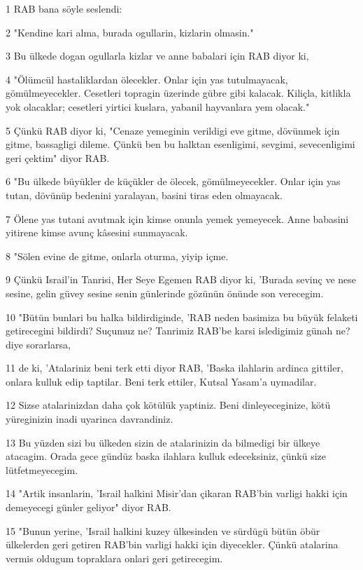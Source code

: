 \par 1 RAB bana söyle seslendi:
\par 2 "Kendine kari alma, burada ogullarin, kizlarin olmasin."
\par 3 Bu ülkede dogan ogullarla kizlar ve anne babalari için RAB diyor ki,
\par 4 "Ölümcül hastaliklardan ölecekler. Onlar için yas tutulmayacak, gömülmeyecekler. Cesetleri topragin üzerinde gübre gibi kalacak. Kiliçla, kitlikla yok olacaklar; cesetleri yirtici kuslara, yabanil hayvanlara yem olacak."
\par 5 Çünkü RAB diyor ki, "Cenaze yemeginin verildigi eve gitme, dövünmek için gitme, bassagligi dileme. Çünkü ben bu halktan esenligimi, sevgimi, sevecenligimi geri çektim" diyor RAB.
\par 6 "Bu ülkede büyükler de küçükler de ölecek, gömülmeyecekler. Onlar için yas tutan, dövünüp bedenini yaralayan, basini tiras eden olmayacak.
\par 7 Ölene yas tutani avutmak için kimse onunla yemek yemeyecek. Anne babasini yitirene kimse avunç kâsesini sunmayacak.
\par 8 "Sölen evine de gitme, onlarla oturma, yiyip içme.
\par 9 Çünkü Israil'in Tanrisi, Her Seye Egemen RAB diyor ki, 'Burada sevinç ve nese sesine, gelin güvey sesine senin günlerinde gözünün önünde son verecegim.
\par 10 "Bütün bunlari bu halka bildirdiginde, 'RAB neden basimiza bu büyük felaketi getirecegini bildirdi? Suçumuz ne? Tanrimiz RAB'be karsi isledigimiz günah ne? diye sorarlarsa,
\par 11 de ki, 'Atalariniz beni terk etti diyor RAB, 'Baska ilahlarin ardinca gittiler, onlara kulluk edip taptilar. Beni terk ettiler, Kutsal Yasam'a uymadilar.
\par 12 Sizse atalarinizdan daha çok kötülük yaptiniz. Beni dinleyeceginize, kötü yüreginizin inadi uyarinca davrandiniz.
\par 13 Bu yüzden sizi bu ülkeden sizin de atalarinizin da bilmedigi bir ülkeye atacagim. Orada gece gündüz baska ilahlara kulluk edeceksiniz, çünkü size lütfetmeyecegim.
\par 14 "Artik insanlarin, 'Israil halkini Misir'dan çikaran RAB'bin varligi hakki için demeyecegi günler geliyor" diyor RAB.
\par 15 "Bunun yerine, 'Israil halkini kuzey ülkesinden ve sürdügü bütün öbür ülkelerden geri getiren RAB'bin varligi hakki için diyecekler. Çünkü atalarina vermis oldugum topraklara onlari geri getirecegim.
